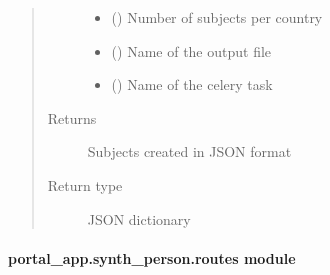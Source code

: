 \documentclass[letterpaper,10pt,english]{sphinxmanual}
\begin{document}
\begin{fulllineitems}
\begin{quote}
\begin{description}
\begin{itemize}
\item {} 
\sphinxAtStartPar
{} (\sphinxstyleliteralemphasis{\sphinxupquote{ (}}\sphinxstyleliteralemphasis{\sphinxupquote{, }}\sphinxstyleliteralemphasis{\sphinxupquote{) }}\sphinxstyleliteralemphasis{\sphinxupquote{ (}}\sphinxstyleliteralemphasis{\sphinxupquote{, }}\sphinxstyleliteralemphasis{\sphinxupquote{)}}) \textendash{} Number of subjects per country

\item {} 
\sphinxAtStartPar
{} () \textendash{} Name of the output file

\item {} 
\sphinxAtStartPar
{} () \textendash{} Name of the celery task

\end{itemize}

\item[{Returns}] \leavevmode
\sphinxAtStartPar
Subjects created in JSON format

\item[{Return type}] \leavevmode
\sphinxAtStartPar
JSON dictionary

\end{description}\end{quote}

\end{fulllineitems}



\paragraph{portal\_app.synth\_person.routes module}
\label{\detokenize{CE_app.synth_person:module-CE_app.synth_person.routes}}\label{\detokenize{CE_app.synth_person:portal-app-synth-person-routes-module}}
\end{document}
